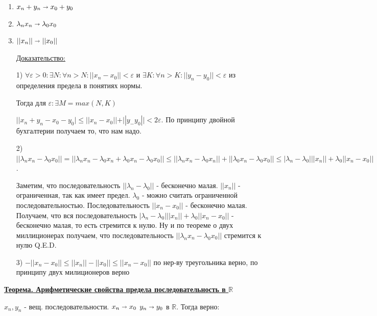 \documentclass{article}
\newcommand{\thmm}[1]{\underline{\textbf{#1}}}
\begin{document}
\begin{enumerate}
    \item $x_n+y_n \shortrightarrow x_0 +y_0$

    \item $\lambda_n x_n \shortrightarrow \lambda_0 x_0$

    \item $||x_n|| \shortrightarrow ||x_0||$
\end{enumerate}
\begin{enumerate}
    \item[] \uline{Доказательство:}
    \item[1)] $\forall \varepsilon >0: \exists N: \forall n >N: ||x_n-x_0||<\varepsilon$ и $\exists K: \forall n > K: ||y_n-y_0||<\varepsilon$ из определения предела в понятиях нормы.

    Тогда для $\varepsilon: \exists M = max(N,K)$

    $||x_n + y_n -x_0 -y_0
| \leq ||x_n-x_0|| + ||y_-y_0||<2\varepsilon$. По принципу двойной бухгалтерии получаем то, что нам надо.

    \item[2)] $||\lambda_n x_n - \lambda_0 x_0||=||\lambda_n x_n - \lambda_0 x_n + \lambda_0 x_n - \lambda_0 x_0|| \leq ||\lambda_n x_n - \lambda_0 x_n|| + ||\lambda_0 x_n - \lambda_0 x_0|| \leq |\lambda_n-\lambda_0|||x_n|| + \lambda_0 ||x_n-x_0||$.

    Заметим, что последовательность $||\lambda_n - \lambda_0||$ - бесконечно малая. $||x_n||$ - ограниченная, так как имеет предел. $\lambda_0$ - можно считать ограниченной последовательностью. Последовательность $||x_n-x_0||$ - бесконечно малая. Получаем, что вся последовательность $|\lambda_n-\lambda_0|||x_n|| + \lambda_0 ||x_n-x_0||$ - бесконечно малая, то есть стремится к нулю. Ну и по теореме о двух миллиционерах получаем, что последовательность $||\lambda_n x_n - \lambda_0 x_0||$  стремится к нулю Q.E.D.

    \item[3)] $-||x_n-x_0|| \leq ||x_n||-||x_0|| \leq ||x_n - x_0||$ по нер-ву треугольника верно, по принципу двух милиционеров верно

    \end{enumerate}

    \thmm{Теорема. Арифметические свойства предела последовательность в $\mathbb{R}$}

    $x_n,y_n$ - вещ. последовательности. $x_n \shortrightarrow x_0$ $y_n \shortrightarrow y_0$ в $\mathbb{R}$. Тогда верно:
\end{document}
